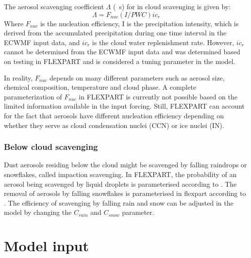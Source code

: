 The aerosol scavenging coefficient $\Lambda$ (\si{\per\s}) for in cloud scavenging is given by:
\begin{equation}
    \Lambda = F_{nuc}\left(I/PWC\right)ic_r
\end{equation}
Where $F_{nuc}$ is the nucleation efficiency, I is the precipitation intensity, which is derived from the accumulated precipitation during one time interval in the ECWMF input data, and $ic_r$ is the cloud water replenishment rate. However, $ic_r$ cannot be determined from the ECWMF input data and was determined based on testing in FLEXPART and is considered a tuning parameter in the model.   

In reality, $F_{nuc}$ depends on many different parameters such as aerosol size, chemical composition, temperature and cloud phase. 
A complete parameterization of $F_{nuc}$ in FLEXPART is currently not possible based on the limited information available in the input forcing. 
Still, FLEXPART can account for the fact that aerosols have different nucleation efficiency depending on whether they serve as cloud condensation nuclei (CCN) or ice nuclei (IN). 

\subsubsection{Below cloud scavenging}
Dust aerosols residing below the cloud might be scavenged by falling raindrops or snowflakes, called impaction scavenging. 
In FLEXPART, the probability of an aerosol being scavenged by liquid droplets is parameterised according to \textcite{laakso2003ultrafine}. 
The removal of aerosols by falling snowflakes is parameterised in \acrshort{flexpart} according to \textcite{kyro2009snow}.
The efficiency of scavenging by falling rain and snow can be adjusted in the model by changing the $C_{rain}$ and $C_{snow}$ parameter.   

\section{Model input}

